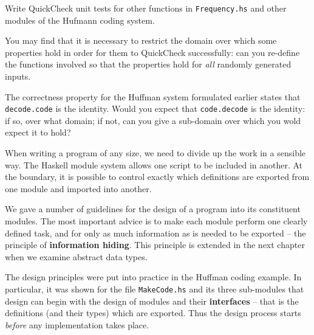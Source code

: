 \begin{exercises}
\item
Write QuickCheck unit tests for other functions in \texttt{Frequency.hs} and other modules of the Hufmann coding system.

\item
You may find that it is necessary to restrict the domain over which some properties hold in order for them to QuickCheck successfully: can you re-define the functions involved so that the properties hold for \emph{all} randomly generated inputs.

\item
The correctness property for the Huffman system formulated earlier states that \texttt{decode.code} is the identity. Would you expect that \texttt{code.decode} is the identity: if so, over what domain; if not, can you give a sub-domain over which you wold expect it to hold?


\end{exercises}

\begin{summary}
When writing a program of any size, we need to divide up the work in a
sensible way. The Haskell module system allows one script to be
included in another. At the boundary, it is possible to control exactly which
definitions are exported from one module and imported into another.

We gave a number of guidelines for the design of a program into its
constituent modules. The most important advice is to make each module perform
one clearly defined task, and for only as much information as is needed to be
exported -- the principle of \textbf{information hiding}. This principle 
is extended in the next chapter when we examine abstract
data types.

The design principles were put into practice in the Huffman coding
example. In particular, it was shown for the file \texttt{MakeCode.hs} and
its three sub-modules that design can begin with the design of modules and
their \textbf{interfaces} -- that is the definitions (and their types) which are
exported. Thus the design process starts {\em before\/} any
implementation takes place.
 


\end{summary}


%
